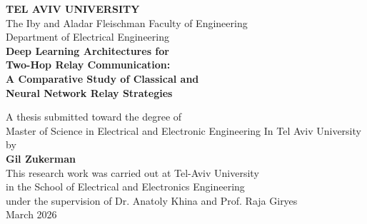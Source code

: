 \begin{titlepage}
\begin{center}
\vspace*{0.5cm}

{\LARGE\textbf{TEL AVIV UNIVERSITY}}\\[6pt]
{\large The Iby and Aladar Fleischman Faculty of Engineering}\\[4pt]
{\large Department of Electrical Engineering}\\[2cm]

{\LARGE\bfseries
Deep Learning Architectures for\\[6pt]
Two-Hop Relay Communication:\\[6pt]
A Comparative Study of Classical and\\[6pt]
Neural Network Relay Strategies\\[2cm]
}

{\large A thesis submitted toward the degree of}\\[4pt]
{\large Master of Science in Electrical and Electronic Engineering \newline In Tel Aviv University}\\[1.5cm]

{\large by}\\[6pt]
{\Large\bfseries Gil Zukerman}\\[1.5cm]
This research work was carried out at Tel-Aviv University\\
in the School of Electrical and Electronics Engineering\\
under the supervision of Dr. Anatoly Khina and Prof. Raja Giryes\\
\vfill
{\large{March 2026}}\\[1.5cm]
\vfill
\end{center}
\end{titlepage}


